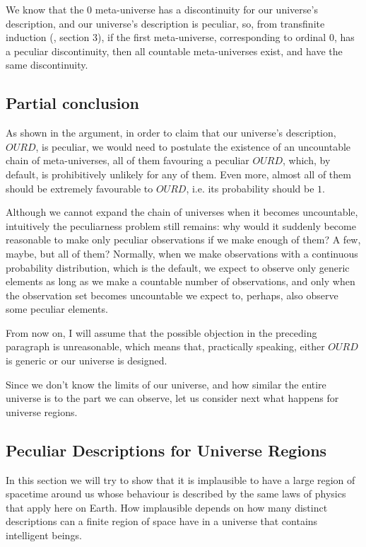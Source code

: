 \documentclass[a4paper
,draft
]{article}
\def\our_description{OURD}
\begin{document}
We know that the $0$ meta-universe has a discontinuity for
our universe's description, and our universe's description is peculiar, so,
from transfinite induction (\textcite{Cohen1966}, section 3),
if the first meta-universe,
corresponding to ordinal $0$, has a peculiar discontinuity, then all countable
meta-universes exist, and have the same discontinuity.

\subsection{Partial conclusion}

As shown in the argument, in order to claim that our universe's description,
$\our_description$, is peculiar,
we would need to postulate the
existence of an uncountable chain of meta-universes, all of them favouring a
peculiar $\our_description$, which, by default,
is prohibitively unlikely for any of them. Even more, almost all of them
should be extremely favourable to $\our_description$, i.e. its probability
should be $1$.

Although we cannot expand the chain of universes when it becomes uncountable,
intuitively the peculiarness problem
still remains: why would it suddenly become reasonable to make
only peculiar observations if we make enough of them? A few, maybe, but all
of them? Normally, when we make
observations with a continuous probability distribution, which is the default,
we expect to observe only generic elements as long as we make a
countable number of observations, and only when the observation set
becomes uncountable we expect to, perhaps, also observe some peculiar elements.

From now on, I will assume that the possible objection in the preceding
paragraph is unreasonable, which means that, practically speaking,
either $\our_description$ is generic or our universe is designed.

Since we don't know the limits of our universe, and how similar
the entire universe is to the part we can observe, let us consider next
what happens for universe regions.

\subsection{Peculiar Descriptions for Universe Regions}
\label{sec:peculiarregions}

In this section we will try to show that it is implausible to have a large
region of spacetime around us whose behaviour is described by the same laws
of physics that apply here on Earth.
How implausible depends on how many
distinct descriptions can a finite region of space have in a universe
that contains intelligent beings.
\end{document}
